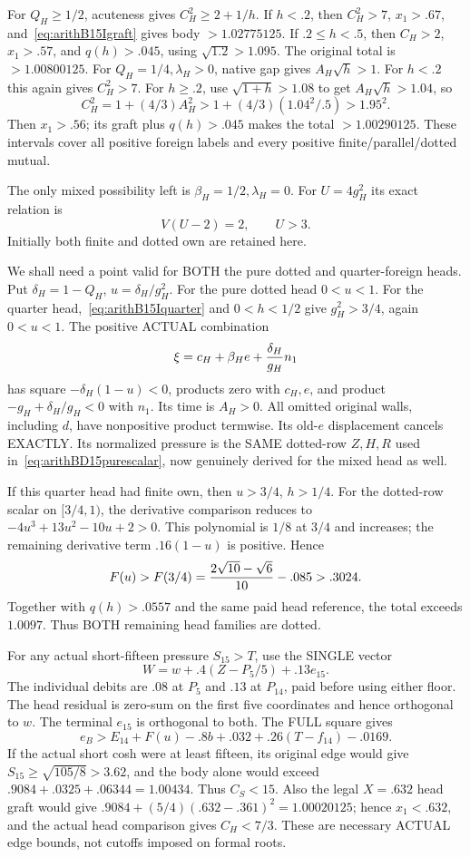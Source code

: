 \documentclass[11pt]{article}
\begin{document}
For \(Q_H\ge1/2\), acuteness gives
\(C_H^2\ge2+1/h\).
If \(h<.2\), then \(C_H^2>7\), \(x_1>.67\),
and~\eqref{eq:arithB15Igraft} gives body \(>1.02775125\).
If \(.2\le h<.5\), then \(C_H>2\), \(x_1>.57\),
and \(q(h)>.045\), using \(\sqrt{1.2}>1.095\).
The original total is \(>1.00800125\).
For \(Q_H=1/4,\lambda_H>0\), native gap gives
\(A_H\sqrt h>1\).
For \(h<.2\) this again gives \(C_H^2>7\).
For \(h\ge.2\), use \(\sqrt{1+h}>1.08\) to get
\(A_H\sqrt h>1.04\), so
\[
 C_H^2=1+(4/3)A_H^2>
             1+(4/3)(1.04^2/.5)>1.95^2.
\]
Then \(x_1>.56\); its graft plus \(q(h)>.045\)
makes the total \(>1.00290125\).
These intervals cover all positive foreign labels
and every positive finite/parallel/dotted mutual.

The only mixed possibility left is
\(\beta_H=1/2,\lambda_H=0\).
For \(U=4g_H^2\) its exact relation is
\[
                           V(U-2)=2,\qquad U>3 .
\tag{BQ}\label{eq:arithB15Iquarter}
\]
Initially both finite and dotted own are retained here.

We shall need a point valid for BOTH the pure dotted
and quarter-foreign heads.
Put \(\delta_H=1-Q_H\), \(u=\delta_H/g_H^2\).
For the pure dotted head \(0<u<1\).
For the quarter head,~\eqref{eq:arithB15Iquarter}
and \(0<h<1/2\) give \(g_H^2>3/4\), again \(0<u<1\).
The positive ACTUAL combination
\[
             \xi=c_H+\beta_H e+{\delta_H\over g_H}n_1
\]
has square \(-\delta_H(1-u)<0\), products zero
with \(c_H,e\), and product
\(-g_H+\delta_H/g_H<0\) with \(n_1\).
Its time is \(A_H>0\).
All omitted original walls, including \(d\), have
nonpositive product termwise.
Its old-\(e\) displacement cancels EXACTLY.
Its normalized pressure is the SAME dotted-row
\(Z,H,R\) used in~\eqref{eq:arithBD15purescalar},
now genuinely derived for the mixed head as well.

If this quarter head had finite own, then
\(u>3/4\), \(h>1/4\).
For the dotted-row scalar on \([3/4,1)\),
the derivative comparison reduces to
\(-4u^3+13u^2-10u+2>0\).
This polynomial is \(1/8\) at \(3/4\) and increases;
the remaining derivative term \(.16(1-u)\) is positive.
Hence
\[
 F(u)>F(3/4)={2\sqrt{10}-\sqrt6\over10}-.085>.3024.
\]
Together with \(q(h)>.0557\) and the same paid
head reference, the total exceeds \(1.0097\).
Thus BOTH remaining head families are dotted.

For any actual short-fifteen pressure \(S_{15}>T\),
use the SINGLE vector
\[
                  W=w+.4(Z-P_5/5)+.13e_{15}.
\]
The individual debits are \(.08\) at \(P_5\) and
\(.13\) at \(P_{14}\), paid before using either floor.
The head residual is zero-sum on the first five
coordinates and hence orthogonal to \(w\).
The terminal \(e_{15}\) is orthogonal to both.
The FULL square gives
\[
 e_B>E_{14}+F(u)-.8b+.032
                    +.26(T-f_{14})-.0169 .
\tag{BT}\label{eq:arithB15Ijoint}
\]
If the actual short cosh were at least fifteen,
its original edge would give
\(S_{15}\ge\sqrt{105/8}>3.62\),
and the body alone would exceed
\(.9084+.0325+.06344=1.00434\).
Thus \(C_S<15\).
Also the legal \(X=.632\) head graft would give
\(.9084+(5/4)(.632-.361)^2=1.00020125\);
hence \(x_1<.632\), and the actual head comparison
gives \(C_H<7/3\).
These are necessary ACTUAL edge bounds, not cutoffs
imposed on formal roots.
\end{document}
